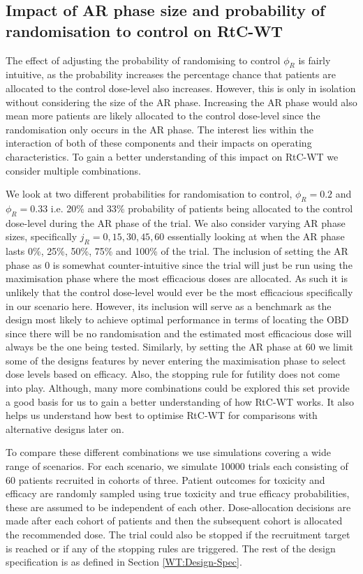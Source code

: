 \subsection{Impact of AR phase size and probability of randomisation to control on RtC-WT}
\label{WT:Impact-ARandRTCon-RtC-WT}


The effect of adjusting the probability of randomising to control $\phi_R$ is fairly intuitive, as the probability increases the percentage chance that patients are allocated to the control dose-level also increases. However, this is only in isolation without considering the size of the AR phase. Increasing the AR phase would also mean more patients are likely allocated to the control dose-level since the randomisation only occurs in the AR phase. The interest lies within the interaction of both of these components and their impacts on operating characteristics. To gain a better understanding of this impact on RtC-WT we consider multiple combinations. 

We look at two different probabilities for randomisation to control, $\phi_R = 0.2$ and $\phi_R = 0.33$ i.e. 20\% and 33\% probability of patients being allocated to the control dose-level during the AR phase of the trial. We also consider varying AR phase sizes, specifically $j_R = 0, 15, 30, 45 ,60$ essentially looking at when the AR phase lasts 0\%, 25\%, 50\%, 75\% and 100\% of the trial. The inclusion of setting the AR phase as 0 is somewhat counter-intuitive since the trial will just be run using the maximisation phase where the most efficacious doses are allocated. As such it is unlikely that the control dose-level would ever be the most efficacious specifically in our scenario here. However, its inclusion will serve as a benchmark as the design most likely to achieve optimal performance in terms of locating the OBD since there will be no randomisation and the estimated most efficacious dose will always be the one being tested. Similarly, by setting the AR phase at 60 we limit some of the designs features by never entering the maximisation phase to select dose levels based on efficacy. Also, the stopping rule for futility does not come into play. Although, many more combinations could be explored this set provide a good basis for us to gain a better understanding of how RtC-WT works. It also helps us understand how best to optimise RtC-WT for comparisons with alternative designs later on.  

To compare these different combinations we use simulations covering a wide range of scenarios. For each scenario, we simulate 10000 trials each consisting of 60 patients recruited in cohorts of three. Patient outcomes for toxicity and efficacy are randomly sampled using true toxicity and true efficacy probabilities, these are assumed to be independent of each other. Dose-allocation decisions are made after each cohort of patients and then the subsequent cohort is allocated the recommended dose. The trial could also be stopped if the recruitment target is reached or if any of the stopping rules are triggered. The rest of the design specification is as defined in Section \ref{WT:Design-Spec}. 


